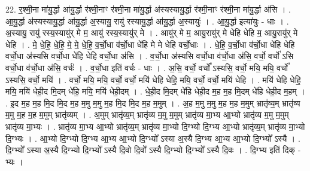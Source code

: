 \documentclass[17pt]{extarticle}
\begin{document}
22. र॒श्मी॒ना मा॑यु॒र्द्धा आ॑यु॒र्द्धा र॑श्मी॒नाꣳ र॑श्मी॒ना मा॑यु॒र्द्धा अ॑स्यस्यायु॒र्द्धा र॑श्मी॒नाꣳ र॑श्मी॒ना मा॑यु॒र्द्धा अ॑सि । . आ॒यु॒र्द्धा अ॑स्यस्यायु॒र्द्धा आ॑यु॒र्द्धा अ॒स्यायु॒ रायु॑ रस्यायु॒र्द्धा आ॑यु॒र्द्धा अ॒स्यायुः॑ । . आ॒यु॒र्द्धा इत्या॑युः - धाः । . अ॒स्यायु॒ रायु॑ रस्य॒स्यायु॑र् मे म॒ आयु॑ रस्य॒स्यायु॑र् मे । . आयु॑र् मे म॒ आयु॒रायु॑र् मे धेहि धेहि म॒ आयु॒रायु॑र् मे धेहि । . मे॒ धे॒हि॒ धे॒हि॒ मे॒ मे॒ धे॒हि॒ व॒र्चो॒धा व॑र्चो॒धा धे॑हि मे मे धेहि वर्चो॒धाः । . धे॒हि॒ व॒र्चो॒धा व॑र्चो॒धा धे॑हि धेहि वर्चो॒धा अ॑स्यसि वर्चो॒धा धे॑हि धेहि वर्चो॒धा अ॑सि । . व॒र्चो॒धा अ॑स्यसि वर्चो॒धा व॑र्चो॒धा अ॑सि॒ वर्चो॒ वर्चो॑ ऽसि वर्चो॒धा व॑र्चो॒धा अ॑सि॒ वर्चः॑ । . व॒र्चो॒धा इति॑ वर्चः - धाः । . अ॒सि॒ वर्चो॒ वर्चो᳚ ऽस्यसि॒ वर्चो॒ मयि॒ मयि॒ वर्चो᳚ ऽस्यसि॒ वर्चो॒ मयि॑ । . वर्चो॒ मयि॒ मयि॒ वर्चो॒ वर्चो॒ मयि॑ धेहि धेहि॒ मयि॒ वर्चो॒ वर्चो॒ मयि॑ धेहि । . मयि॑ धेहि धेहि॒ मयि॒ मयि॑ धेही॒द मि॒दम् धे॑हि॒ मयि॒ मयि॑ धेही॒दम् । . धे॒ही॒द मि॒दम् धे॑हि धेही॒द म॒ह म॒ह मि॒दम् धे॑हि धेही॒द म॒हम् । . इ॒द म॒ह म॒ह मि॒द मि॒द म॒ह म॒मु म॒मु म॒ह मि॒द मि॒द म॒ह म॒मुम् । . अ॒ह म॒मु म॒मु म॒ह म॒ह म॒मुम् भ्रातृ॑व्य॒म् भ्रातृ॑व्य म॒मु म॒ह म॒ह म॒मुम् भ्रातृ॑व्यम् । . अ॒मुम् भ्रातृ॑व्य॒म् भ्रातृ॑व्य म॒मु म॒मुम् भ्रातृ॑व्य मा॒भ्य आ॒भ्यो भ्रातृ॑व्य म॒मु म॒मुम् भ्रातृ॑व्य मा॒भ्यः । . भ्रातृ॑व्य मा॒भ्य आ॒भ्यो भ्रातृ॑व्य॒म् भ्रातृ॑व्य मा॒भ्यो दि॒ग्भ्यो दि॒ग्भ्य आ॒भ्यो भ्रातृ॑व्य॒म् भ्रातृ॑व्य मा॒भ्यो दि॒ग्भ्यः । . आ॒भ्यो दि॒ग्भ्यो दि॒ग्भ्य आ॒भ्य आ॒भ्यो दि॒ग्भ्यो᳚ ऽस्या अ॒स्यै दि॒ग्भ्य आ॒भ्य आ॒भ्यो दि॒ग्भ्यो᳚ ऽस्यै । . दि॒ग्भ्यो᳚ ऽस्या अ॒स्यै दि॒ग्भ्यो दि॒ग्भ्यो᳚ ऽस्यै दि॒वो दि॒वो᳚ ऽस्यै दि॒ग्भ्यो दि॒ग्भ्यो᳚ ऽस्यै दि॒वः । . दि॒ग्भ्य इति॑ दिक् - भ्यः । \newline
\end{document}
